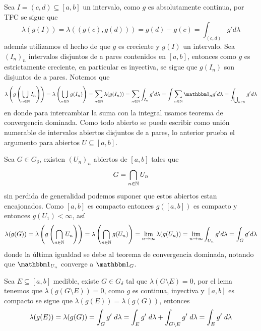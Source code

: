 \documentclass{article}
\begin{document}
\noindent Sea $I=(c,d)\subseteq[a,b]$ un intervalo, como $g$ es absolutamente continua, por TFC 
se sigue que
\begin{equation*}
    \lambda(g(I))=\lambda((g(c),g(d)))=g(d)-g(c)=\int_{(c,d)}g'd\lambda
\end{equation*}
además utilizamos el hecho de que $g$ es creciente y $g(I)$ un intervalo.
Sea $(I_{n})_{n}$ intervalos disjuntos de a pares contenidos en $[a,b]$, entonces como $g$ es 
estrictamente creciente, en particular es inyectiva, se sigue que $g(I_{n})$ son disjuntos de a 
pares. Notemos que
\begin{equation*}
    \lambda\left(g\left(\bigcup_{n\in\N}I_{n}\right)\right)
    =\lambda\left(\bigcup_{n\in\N}g(I_{n})\right)=\sum_{n\in\N}\lambda(g(I_{n}))
    =\sum_{n\in\N}\int_{I_{n}}g'd\lambda=\int\sum_{n\in\N}\I_{n}g'd\lambda
    =\int_{\bigcup_{n\in\N}}g'd\lambda
\end{equation*}
en donde para intercambiar la suma con la integral usamos teorema de convergencia dominada. Como
todo abierto se puede escribir como unión numerable de intervalos abiertos disjuntos de a pares,
lo anterior prueba el argumento para abiertos $U\subseteq[a,b]$.

\vspace{2mm}
\noindent Sea $G\in G_{\delta}$, existen $(U_{n})_{n}$ abiertos de $[a,b]$ tales que
\begin{equation*}
    G=\bigcap_{n\in\mathbb{N}}U_{n}
\end{equation*}
sin perdida de generalidad podemos suponer que estos abiertos estan encajonados. Como $[a,b]$ es
compacto entonces $g([a,b])$ es compacto y entonces $g(U_{1})<\infty$, así
\begin{equation*}
    \lambda(g(G))=\lambda\left(g\left(\bigcap_{n\in\mathbb{N}}U_{n}\right)\right)
    =\lambda\left(\bigcap_{n\in\mathbb{N}}g(U_{n})\right)=\lim\limits_{n\to\infty}\lambda(g(U_{n}))
    =\lim\limits_{n\to\infty}\int_{U_{n}}g'd\lambda=\int_{G}g'd\lambda
\end{equation*}
donde la última igualdad se debe al teorema de convergencia dominada, notando que $\I_{U_{n}}$ 
converge a $\I_{G}$. 

\vspace{2mm}
\noindent Sea $E\subseteq[a,b]$ medible, existe $G\in G_{\delta}$ tal que 
$\lambda(G\setminus E)=0$, por el lema tenemos que $\lambda(g(G\setminus E))=0$, como $g$ es 
continua, inyectiva y $[a,b]$ es compacto se sigue que $\lambda(g(E))=\lambda(g(G))$, entonces
\begin{equation*}
    \lambda(g(E))=\lambda(g(G))=\int_{G}g'\hspace{1mm}d\lambda=\int_{E}g'\hspace{1mm}d\lambda
    +\int_{G\setminus E}g'\hspace{1mm}d\lambda=\int_{E}g'\hspace{1mm}d\lambda
\end{equation*}


\end{document}

